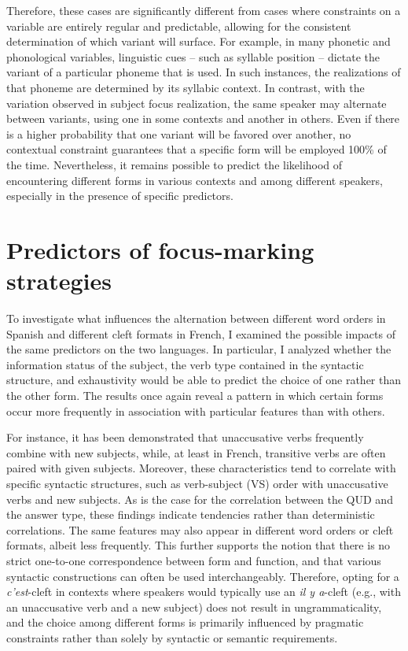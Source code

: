 Therefore, these cases are significantly different from cases where constraints on a variable are entirely regular and predictable, allowing for the consistent determination of which variant will surface. For example, in many phonetic and phonological variables, linguistic cues -- such as syllable position -- dictate the variant of a particular phoneme that is used. In such instances, the realizations of that phoneme are determined by its syllabic context. In contrast, with the variation observed in subject focus realization, the same speaker may alternate between variants, using one in some contexts and another in others. Even if there is a higher probability that one variant will be favored over another, no contextual constraint guarantees that a specific form will be employed 100\% of the time. Nevertheless, it remains possible to predict the likelihood of encountering different forms in various contexts and among different speakers, especially in the presence of specific predictors. 

\section{Predictors of focus-marking strategies} \label{sub:7.2}
To investigate what influences the alternation between different word orders in Spanish and different cleft formats in French, I examined the possible impacts of the same predictors on the two languages. In particular, I analyzed whether the information status of the subject, the verb type contained in the syntactic structure, and exhaustivity would be able to predict the choice of one rather than the other form. The results once again reveal a pattern in which certain forms occur more frequently in association with particular features than with others. 

For instance, it has been demonstrated that unaccusative verbs frequently combine with new subjects, while, at least in French, transitive verbs are often paired with given subjects. Moreover, these characteristics tend to correlate with specific syntactic structures, such as verb-subject (VS) order with unaccusative verbs and new subjects. As is the case for the correlation between the QUD and the answer type, these findings indicate tendencies rather than deterministic correlations. The same features may also appear in different word orders or cleft formats, albeit less frequently. This further supports the notion that there is no strict one-to-one correspondence between form and function, and that various syntactic constructions can often be used interchangeably. Therefore, opting for a \textit{c'est}-cleft in contexts where speakers would typically use an \textit{il y a}-cleft (e.g., with an unaccusative verb and a new subject) does not result in ungrammaticality, and the choice among different forms is primarily influenced by pragmatic constraints rather than solely by syntactic or semantic requirements.

